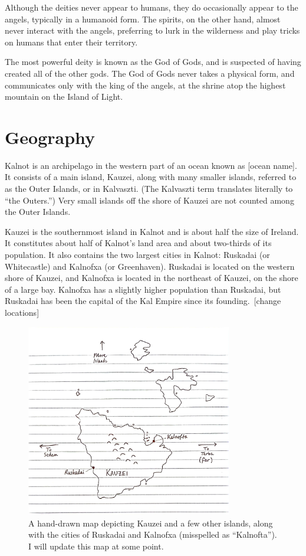 \documentclass{article}
\begin{document}
Although the deities never appear to humans, they do occasionally appear to the angels, typically in a humanoid form. The spirits, on the other hand, almost never interact with the angels, preferring to lurk in the wilderness and play tricks on humans that enter their territory.

The most powerful deity is known as the God of Gods, and is suspected of having created all of the other gods. The God of Gods never takes a physical form, and communicates only with the king of the angels, at the shrine atop the highest mountain on the Island of Light.

\section{Geography}

Kalnot is an archipelago in the western part of an ocean known as [ocean name]. It consists of a main island, Kauzei, along with many smaller islands, referred to as the Outer Islands, or  in Kalvaszti. (The Kalvaszti term translates literally to ``the Outers.'') Very small islands off the shore of Kauzei are not counted among the Outer Islands.

Kauzei is the southernmost island in Kalnot and is about half the size of Ireland. It constitutes about half of Kalnot's land area and about two-thirds of its population. It also contains the two largest cities in Kalnot: Ruskadai (or Whitecastle) and Kalnofxa (or Greenhaven). Ruskadai is located on the western shore of Kauzei, and Kalnofxa is located in the northeast of Kauzei, on the shore of a large bay. Kalnofxa has a slightly higher population than Ruskadai, but Ruskadai has been the capital of the Kal Empire since its founding.\ [change locations]

\begin{figure}
  \centering
  \includegraphics[width=9cm]{kauzei}
  \caption{A hand-drawn map depicting Kauzei and a few other islands, along with the cities of Ruskadai and Kalnofxa (misspelled as ``Kalnofta''). I will update this map at some point.}
\end{figure}
\end{document}
